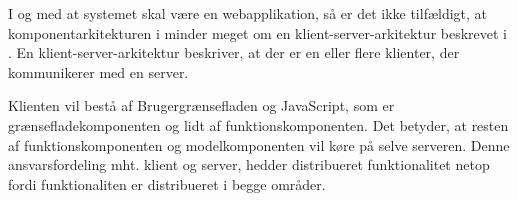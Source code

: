 I og med at systemet skal være en webapplikation, så er det ikke tilfældigt, at komponentarkitekturen i  minder meget om en klient-server-arkitektur beskrevet i . En klient-server-arkitektur beskriver, at der er en eller flere klienter, der kommunikerer med en server. 

Klienten vil bestå af Brugergrænsefladen og JavaScript, som er grænsefladekomponenten og lidt af funktionskomponenten. Det betyder, at resten af funktionskomponenten og modelkomponenten vil køre på selve serveren. Denne ansvarsfordeling mht. klient og server, hedder distribueret funktionalitet netop fordi funktionaliten er distribueret i begge områder.
